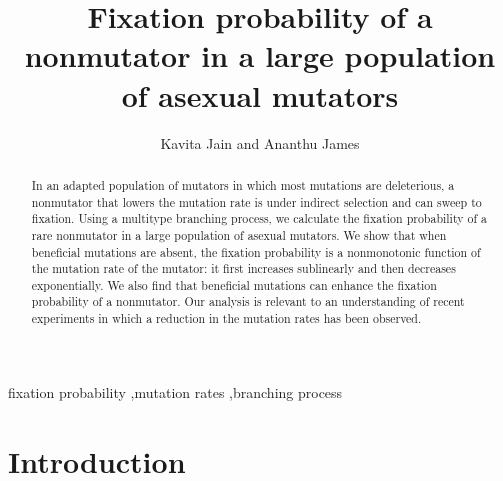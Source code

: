 \documentclass[preprint,12pt,number]{elsarticle}
\begin{document}
\def\be{\begin{equation}}
\def\ee{\end{equation}}
\def\bea{\begin{eqnarray}}
\def\eea{\end{eqnarray}}
\def\bml{\begin{mathletters}}
\def\eml{\end{mathletters}}
\def\l{\label}
\def\b{\bullet}
\def\eqn#1{(~\ref{eq:#1}~)}
\def\no{\nonumber}
\def\av#1{{\langle  #1 \rangle}}
\newcommand{\tc}{\textcolor}
\begin{frontmatter}
\title{Fixation probability of a nonmutator in a large population of asexual mutators}


\author{Kavita Jain and Ananthu James}

\address{Theoretical Sciences Unit,
Jawaharlal Nehru Centre for Advanced Scientific Research, Jakkur,
Bangalore 560064, India} 

\begin{abstract}
In an adapted  population of mutators in which most mutations are deleterious, a nonmutator that lowers the mutation rate is under indirect selection and can sweep to fixation.  Using a multitype branching process, we calculate the fixation probability of a rare nonmutator in a large population of asexual mutators. We show that when beneficial mutations are absent, the fixation probability is a nonmonotonic function of the mutation rate of the mutator: it first increases sublinearly and then decreases exponentially. We also find that beneficial mutations can enhance the fixation probability of a nonmutator. Our analysis  is relevant to an understanding of recent experiments in which a reduction in the mutation rates has been observed. 
\end{abstract}

\begin{keyword}
fixation probability \sep mutation rates \sep branching process
\end{keyword}
\end{frontmatter}


\section{Introduction}\label{intr}
\end{document}
